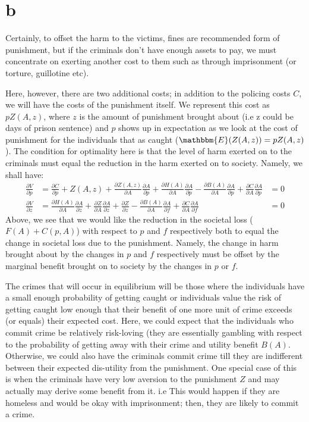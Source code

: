 \documentclass[12pt]{paper}
\begin{document}
\section*{b}
Certainly, to offset the harm to the victims, fines are recommended
form of punishment, but if the criminals don't have enough assets to
pay, we must concentrate on exerting another cost to them such as
through imprisonment (or torture, guillotine etc). \par
Here, however, there are two additional costs; in addition to the
policing costs $C$, we will have the costs of the punishment
itself. We represent this cost as $pZ(A,z)$, where $z$ is the
amount of punishment brought about (i.e z could be days of prison
sentence) and $p$ shows up in expectation as we look at the cost of
punishment for the individuals that as caught
($\mathbbm{E}(Z(A,z)) = pZ(A,z) $). The condition for optimality here
is that the level of harm exerted on to the criminals must equal the
reduction in the harm exerted on to society. Namely, we shall have:
\begin{align*} 
 \frac{\partial V}{\partial p} & = \frac{\partial C}{\partial p} + Z(A,z) + \frac{\partial Z(A,z)}{\partial A}\frac{\partial A}{\partial p} + \frac{\partial{H(A)}}{ \partial{A}} \frac{ \partial{A}}{\partial{p}} - \frac{\partial{B(A)}}{\partial{A}}\frac{\partial{A}}{\partial{p}} + \frac{\partial{C}}{\partial{A}}\frac{\partial{A}}{\partial{p}} &=0\\
  \frac{\partial V}{\partial z} & = \frac{\partial{H(A)}}{\partial{A}} \frac{\partial{A}}{\partial{z}} + \frac{\partial{Z}}{\partial{A}} \frac{\partial{A}}{\partial{z}} + \frac{\partial{Z}}{\partial{z}} - \frac{\partial{B(A)}}{\partial{A}}\frac{\partial{A}}{\partial{f}} + \frac{\partial{C}}{\partial{A}}\frac{\partial{A}}{\partial{f}} &= 0
\end{align*}
Above, we see that we would like the reduction in the societal loss
($F(A) + C(p,A)$) with respect to $p$ and $f$ respectively both to
equal the change in societal loss due to the punishment. Namely, the
change in harm brought about by the changes in $p$ and $f$
respectively must be offset by the marginal benefit brought on to
society by the changes in $p$ or $f$. \par
The crimes that will occur in equilibrium will be those where the
individuals have a small enough probability of getting caught or
individuals value the risk of getting caught low enough that their
benefit of one more unit of crime exceeds (or equals) their expected
cost. Here, we could expect that the individuals who commit crime be
relatively risk-loving (they are essentially gambling with respect to
the probability of getting away with their crime and utility benefit
$B(A)$. Otherwise, we could also have the criminals commit crime till
they are indifferent between their expected dis-utility from the
punishment. One special case of this is when the criminals have very
low aversion to the punishment $Z$ and may actually may derive some
benefit from it. i.e This would happen if they are homeless and would
be okay with imprisonment; then, they are likely to commit a crime.
\pagebreak
\end{document}
